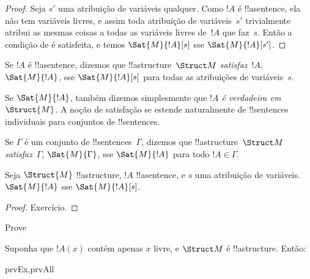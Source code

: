 \documentclass[../../../include/open-logic-section]{subfiles}
\begin{document}
\begin{proof}
  Seja $s'$ uma atribuição de variáveis qualquer. Como $!A$ é !!a{sentence}, ela
  não tem variáveis livres, e assim toda atribuição de variáveis~$s'$
  trivialmente atribui as mesmas coisas a todas as variáveis livres de~$!A$ que
  faz~$s$. Então a condição de  é satisfeita,
  e temos $\Sat{M}{!A}[s]$ sse $\Sat{M}{!A}[s']$.
\end{proof}

\begin{defn}
Se $!A$ é !!a{sentence}, dizemos que !!a{structure}~$\Struct M$
\emph{satisfaz}~$!A$, $\Sat{M}{!A}$, sse $\Sat{M}{!A}[s]$ para todas as
atribuições de variáveis~$s$.
\end{defn}

Se $\Sat{M}{!A}$, também dizemos simplesmente que \emph{$!A$ é verdadeira
em~$\Struct{M}$.} A noção de satisfação se estende naturalmente
de !!{sentence}s individuais para conjuntos de !!{sentence}s.

\begin{defn}
Se $\Gamma$ é um conjunto de !!{sentence}s~$\Gamma$, dizemos que
!!a{structure}~$\Struct M$ \emph{satisfaz}~$\Gamma$,
$\Sat{M}{\Gamma}$, sse $\Sat{M}{!A}$ para todo $!A \in \Gamma$.
\end{defn}

\begin{prop}
  Seja $\Struct{M}$ !!a{structure}, $!A$ !!a{sentence}, e $s$ uma
  atribuição de variáveis.  $\Sat{M}{!A}$ sse $\Sat{M}{!A}[s]$.
\end{prop}

\begin{proof}
Exercício.
\end{proof}

\begin{prob}
Prove 
\end{prob}

\begin{prop}
  Suponha que $!A(x)$ contém apenas $x$ livre, e $\Struct M$ é
  !!a{structure}. Então:
  \begin{tagenumerate}{prvEx,prvAll}
\end{tagenumerate}
\end{prop}
\end{document}
